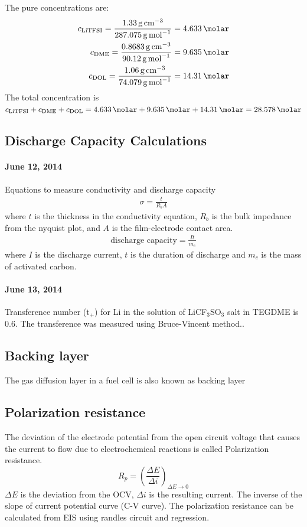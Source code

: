 \documentclass[12pt]{book}
\begin{document}
The pure concentrations are: 
\begin{align}
c_{\ce{LiTFSI}} = \frac{\SI{1.33}{\gram\per\cubic\centi\meter}}{\SI{287.075}{\gram\per\mol}} = \SI{4.633}{\molar} \\
c_{\ce{DME}} = \frac{\SI{0.8683}{\gram\per\cubic\centi\meter}}{\SI{90.12}{\gram\per\mol}} = \SI{9.635}{\molar}\\
c_{\ce{DOL}} = \frac{\SI{1.06}{\gram\per\cubic\centi\meter}}{\SI{74.079}{\gram\per\mol}} = \SI{14.31}{\molar}
\end{align}
The total concentration is $c_{\ce{LiTFSI}} + c_{\ce{DME}} + c_{\ce{DOL}} = \SI{4.633}{\molar} + \SI{9.635}{\molar} + \SI{14.31}{\molar} = \SI{28.578}{\molar}$


\subsection{Discharge Capacity Calculations}
\paragraph*{June 12, 2014}
Equations to measure conductivity and discharge capacity
\begin{align}
\sigma=\frac{t}{R_b A}
\end{align}
where $t$ is the thickness in the conductivity equation, $R_b$ is the bulk impedance from the nyquist plot, and $A$ is the film-electrode contact area\cite{Noor2013}.
\begin{align}
\textrm{discharge capacity}=\frac{It}{m_c}
\end{align}
where $I$ is the discharge current, $t$ is the duration of discharge and $m_c$ is the mass of activated carbon\cite{Noor2013}.
\paragraph*{June 13, 2014}
Transference number (t$_+$) for Li in the solution of LiCF$_3$SO$_3$ salt in TEGDME is 0.6. The transference was measured using Bruce-Vincent method.\cite{Antonio2013}.

\subsection{Backing layer}
The gas diffusion layer in a fuel cell is also known as backing layer

\subsection{Polarization resistance}
The deviation of the electrode potential from the open circuit voltage that causes the current to flow due to electrochemical reactions is called Polarization resistance.
\begin{equation}
R_p = \left(\frac{\Delta E}{\Delta i}\right)_{\Delta E\rightarrow 0}
\end{equation} 
$\Delta E$ is the deviation from the OCV, $\Delta i$ is the resulting current. The inverse of the slope of current potential curve (C-V curve).
The polarization resistance can be calculated from EIS using randles circuit and regression.
\end{document}
